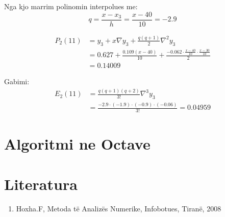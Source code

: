 \documentclass[12pt, margin=1in, a4paper]{article}
\begin{document}
  Nga kjo marrim polinomin interpolues me:
  \begin{equation}
    q = \frac{x - x_3}{h} = \frac{x - 40}{10} = -2.9
  \end{equation}

  \begin{equation}
  \begin{aligned}
    P_2(11) &= y_3 + x\nabla y_3 + \frac{q(q + 1)}{2}\nabla^2y_3 \\
    &= 0.627 + \frac{0.109(x - 40)}{10} + \frac{-0.062 \cdot \frac{x - 40}{10} \cdot \frac{x - 30}{10}}{2} \\
    &= 0.14009
  \end{aligned}
  \end{equation}

  Gabimi:
  \begin{equation}
  \begin{aligned}
    E_2(11) &= \frac{q(q + 1)(q + 2)}{3!}\nabla^3y_3 \\
    &= \frac{-2.9 \cdot (-1.9) \cdot (-0.9) \cdot (-0.06)}{3!} = 0.04959
  \end{aligned}
  \end{equation}

  \newpage

\section{Algoritmi ne Octave}
  \newpage

\section{Literatura}
\begin{enumerate}
  \item Hoxha.F, Metoda të Analizës Numerike, Infobotues, Tiranë, 2008
\end{enumerate}
\end{document}
